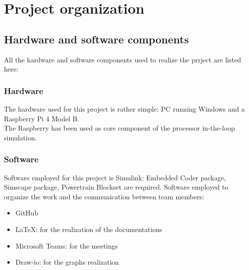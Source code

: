 \documentclass[12pt,a4paper]{report}
\begin{document}
\chapter{Project organization}
\section{Hardware and software components}
All the hardware and software components used to realize the prrject are listed here:
\subsection{Hardware}
The hardware used for this project is rather simple: PC running Windows and a Raspberry Pi 4 Model B.\\
The Raspberry has been used as core component of the processor in-the-loop simulation.
\subsection{Software}
Software employed for this project is Simulink: Embedded Coder package, Simscape package, Powertrain Blockset are required.
Software employed to organize the work and the communication between team members:
\begin{itemize}
	\item GitHub
	\item LaTeX: for the realization of the documentations
	\item Microsoft Teams: for the meetings
	\item Draw-io: for the graphs realization
\end{itemize}
\end{document}
